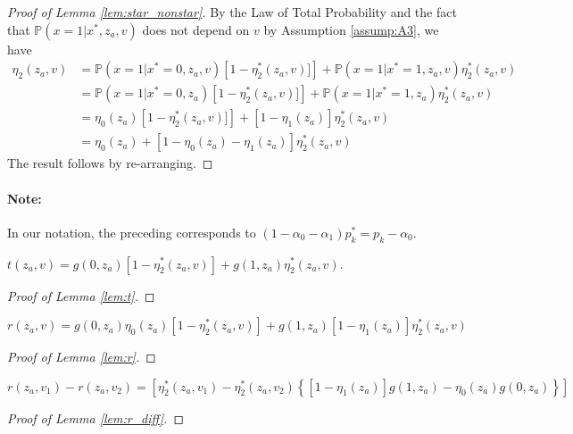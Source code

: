\documentclass[12pt]{article}
\begin{document}
\begin{proof}[Proof of Lemma \ref{lem:star_nonstar}]
  By the Law of Total Probability and the fact that $\mathbb{P}(x=1|x^*,z_a, v)$ does not depend on $v$ by Assumption \ref{assump:A3}, we have
  \begin{align*}
    \eta_2(z_a,v) &= \mathbb{P}(x=1|x^*=0,z_a,v)\left[ 1 - \eta_2^*(z_a,v)]\right] + \mathbb{P}(x=1|x^*=1,z_a,v)\eta^*_2(z_a,v)\\
    &= \mathbb{P}(x=1|x^*=0,z_a)\left[ 1 - \eta_2^*(z_a,v)]\right] + \mathbb{P}(x=1|x^*=1,z_a)\eta^*_2(z_a,v)\\
    &= \eta_0(z_a)\left[ 1 - \eta_2^*(z_a,v)]\right] + \left[1 - \eta_1(z_a)\right]\eta^*_2(z_a,v)\\
    &= \eta_0(z_a) + \left[ 1 - \eta_0(z_a) - \eta_1(z_a) \right] \eta_2^*(z_a,v)
  \end{align*}
  The result follows by re-arranging.
\end{proof}

\paragraph{Note:} In our notation, the preceding corresponds to $(1 - \alpha_0 - \alpha_1) p_k^* = p_k - \alpha_0$.

\begin{lem}
  $t(z_a,v) = g(0, z_a)\left[ 1 - \eta_2^*(z_a,v) \right] + g(1,z_a)\eta_2^*(z_a,v)$.
  \label{lem:t}
\end{lem}

\begin{proof}[Proof of Lemma \ref{lem:t}]
\end{proof}

\begin{lem}
  $r(z_a,v) = g(0,z_a)\eta_0(z_a) \left[ 1 - \eta_2^*(z_a,v) \right] + g(1, z_a) \left[ 1 - \eta_1(z_a) \right]\eta_2^*(z_a,v)$
  \label{lem:r} 
\end{lem}

\begin{proof}[Proof of Lemma \ref{lem:r}]
\end{proof}

\begin{lem}
  \[r(z_a,v_1) - r(z_a,v_2) = \left[ \eta_2^*(z_a,v_1) - \eta_2^*(z_a,v_2)\left\{ \left[ 1 - \eta_1(z_a) \right]g(1,z_a) - \eta_0(z_a)g(0,z_a) \right\} \right]\]
  \label{lem:r_diff}
\end{lem}

\begin{proof}[Proof of Lemma \ref{lem:r_diff}]
\end{proof}
\end{document}

